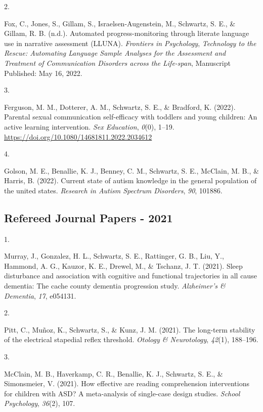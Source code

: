 \documentclass[11pt,a4paper,]{moderncv}
\newlength{\csllabelwidth}
\newcommand{\CSLLeftMargin}[1]{\parbox[t]{\csllabelwidth}{#1}}
\newcommand{\CSLRightInline}[1]{\parbox[t]{\linewidth - \csllabelwidth}{#1}}
\begin{document}
\leavevmode{}%
\CSLLeftMargin{2. }
\CSLRightInline{Fox, C., Jones, S., Gillam, S., Israelsen-Augenstein,
M., Schwartz, S. E., \& Gillam, R. B. (n.d.). Automated
progress-monitoring through literate language use in narrative
assessment (LLUNA). \emph{Frontiers in Psychology}, \emph{Technology to
the Rescue: Automating Language Sample Analyses for the Assessment and
Treatment of Communication Disorders across the Life-span}, Manuscript
Published: May 16, 2022.}

\leavevmode{}%
\CSLLeftMargin{3. }
\CSLRightInline{Ferguson, M. M., Dotterer, A. M., Schwartz, S. E., \&
Bradford, K. (2022). Parental sexual communication self-efficacy with
toddlers and young children: An active learning intervention. \emph{Sex
Education}, \emph{0}(0), 1--19.
\url{https://doi.org/10.1080/14681811.2022.2034612}}

\leavevmode{}%
\CSLLeftMargin{4. }
\CSLRightInline{Golson, M. E., Benallie, K. J., Benney, C. M., Schwartz,
S. E., McClain, M. B., \& Harris, B. (2022). Current state of autism
knowledge in the general population of the united states. \emph{Research
in Autism Spectrum Disorders}, \emph{90}, 101886.}

\hypertarget{refereed-journal-papers---2021}{%
\subsection{\texorpdfstring{\textbf{Refereed Journal Papers -
2021}}{Refereed Journal Papers - 2021}}\label{refereed-journal-papers---2021}}

\hypertarget{refs_journals2021}{}
\leavevmode{}%
\CSLLeftMargin{1. }
\CSLRightInline{Murray, J., Gonzalez, H. L., Schwartz, S. E., Rattinger,
G. B., Liu, Y., Hammond, A. G., Kauzor, K. E., Drewel, M., \& Tschanz,
J. T. (2021). Sleep disturbance and association with cognitive and
functional trajectories in all cause dementia: The cache county dementia
progression study. \emph{Alzheimer's \& Dementia}, \emph{17}, e054131.}

\leavevmode{}%
\CSLLeftMargin{2. }
\CSLRightInline{Pitt, C., Muñoz, K., Schwartz, S., \& Kunz, J. M.
(2021). The long-term stability of the electrical stapedial reflex
threshold. \emph{Otology \& Neurotology}, \emph{42}(1), 188--196.}

\leavevmode{}%
\CSLLeftMargin{3. }
\CSLRightInline{McClain, M. B., Haverkamp, C. R., Benallie, K. J.,
Schwartz, S. E., \& Simonsmeier, V. (2021). How effective are reading
comprehension interventions for children with ASD? A meta-analysis of
single-case design studies. \emph{School Psychology}, \emph{36}(2),
107.}
\end{document}
